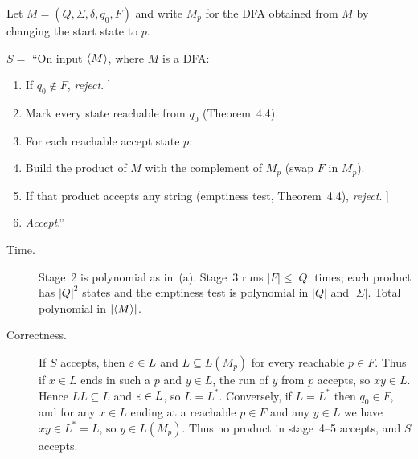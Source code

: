 \begin{soln}
Let $M=(Q,\Sigma,\delta,q_0,F)$ and write $M_p$ for the DFA obtained from $M$ by changing the start state to $p$.

$S=$ ``On input $\langle M\rangle$, where $M$ is a DFA:
\begin{enumerate}
\item If $q_0\notin F$, \emph{reject}. \quad[[ $\eps\notin L(M)$ ]]
\item Mark every state reachable from $q_0$ (Theorem~4.4).
\item For each reachable accept state $p$:
\item \quad Build the product of $M$ with the complement of $M_p$ (swap $F$ in $M_p$).
\item \quad If that product accepts any string (emptiness test, Theorem~4.4), \emph{reject}.
      \quad[[ some $x\in L(M)$ is rejected from $p$, so $LL\nsubseteq L$ ]]
\item \emph{Accept}.''
\end{enumerate}

\begin{description}
\item[Time.] Stage~2 is polynomial as in~(a). Stage~3 runs $|F|\le|Q|$ times; each product has $|Q|^2$ states and the emptiness test is polynomial in $|Q|$ and $|\Sigma|$. Total polynomial in $|\langle M\rangle|$.
\item[Correctness.]
If $S$ accepts, then $\varepsilon\in L$ and $L\subseteq L(M_p)$ for every reachable $p\in F$. Thus if $x\in L$ ends in such a $p$ and $y\in L$, the run of $y$ from $p$ accepts, so $xy\in L$. Hence $LL\subseteq L$ and $\varepsilon\in L$, so $L=L^*$.
Conversely, if $L=L^*$ then $q_0\in F$, and for any $x\in L$ ending at a reachable $p\in F$ and any $y\in L$ we have $xy\in L^*=L$, so $y\in L(M_p)$. Thus no product in stage~4--5 accepts, and $S$ accepts.
\end{description}
\end{soln}

